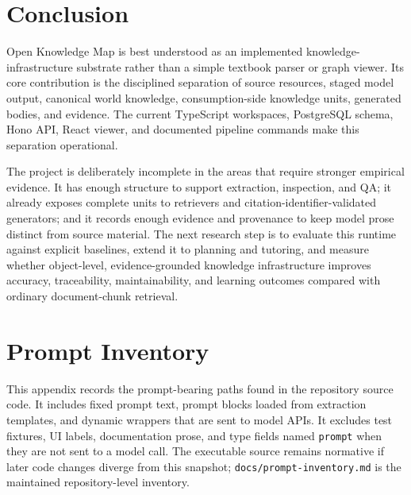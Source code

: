 \documentclass[11pt,letterpaper]{article}
\newcommand{\code}[1]{\nolinkurl{#1}}
\newcommand{\OKM}{Open Knowledge Map}
\begin{document}
\section{Conclusion}

\OKM{} is best understood as an implemented knowledge-infrastructure substrate rather than a simple textbook parser or graph viewer. Its core contribution is the disciplined separation of source resources, staged model output, canonical world knowledge, consumption-side knowledge units, generated bodies, and evidence. The current TypeScript workspaces, PostgreSQL schema, Hono API, React viewer, and documented pipeline commands make this separation operational.

The project is deliberately incomplete in the areas that require stronger empirical evidence. It has enough structure to support extraction, inspection, and QA; it already exposes complete units to retrievers and citation-identifier-validated generators; and it records enough evidence and provenance to keep model prose distinct from source material. The next research step is to evaluate this runtime against explicit baselines, extend it to planning and tutoring, and measure whether object-level, evidence-grounded knowledge infrastructure improves accuracy, traceability, maintainability, and learning outcomes compared with ordinary document-chunk retrieval.

\newpage

\appendix

\section{Prompt Inventory}
\label{app:prompt-inventory}

This appendix records the prompt-bearing paths found in the repository source code. It includes fixed prompt text, prompt blocks loaded from extraction templates, and dynamic wrappers that are sent to model APIs. It excludes test fixtures, UI labels, documentation prose, and type fields named \code{prompt} when they are not sent to a model call. The executable source remains normative if later code changes diverge from this snapshot; \code{docs/prompt-inventory.md} is the maintained repository-level inventory.
\end{document}
